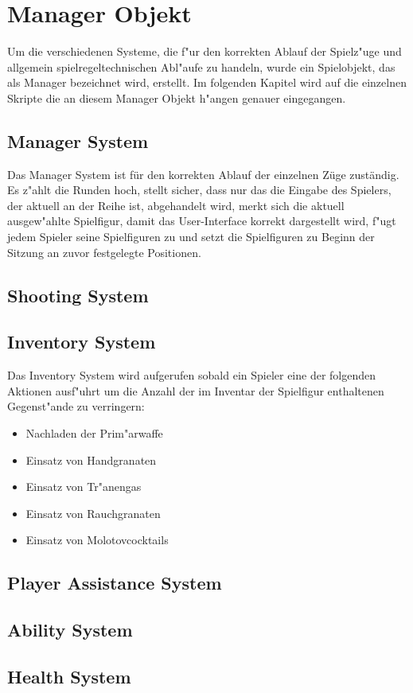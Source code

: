 \chapter{Manager Objekt}

Um die verschiedenen Systeme, die f"ur den korrekten Ablauf der Spielz"uge und allgemein spielregeltechnischen Abl"aufe zu handeln, wurde ein Spielobjekt, das als Manager bezeichnet wird, erstellt. Im folgenden Kapitel wird auf die einzelnen Skripte die an diesem Manager Objekt h"angen genauer eingegangen. 

\section{Manager System}

Das Manager System ist für den korrekten Ablauf der einzelnen Züge zuständig. Es z"ahlt die Runden hoch, stellt sicher, dass nur das die Eingabe des Spielers, der aktuell an der Reihe ist, abgehandelt wird, merkt sich die aktuell ausgew"ahlte Spielfigur, damit das User-Interface korrekt dargestellt wird, f"ugt jedem Spieler seine Spielfiguren zu und setzt die Spielfiguren zu Beginn der Sitzung an zuvor festgelegte Positionen.

\section{Shooting System}



\section{Inventory System}

Das Inventory System wird aufgerufen sobald ein Spieler eine der folgenden Aktionen ausf"uhrt um die Anzahl der im Inventar der Spielfigur enthaltenen Gegenst"ande zu verringern:\newline


\begin{itemize}
	\item Nachladen der Prim"arwaffe
	\item Einsatz von Handgranaten
	\item Einsatz von Tr"anengas
	\item Einsatz von Rauchgranaten
	\item Einsatz von Molotovcocktails
\end{itemize}





\section{Player Assistance System}



\section{Ability System}



\section{Health System}


